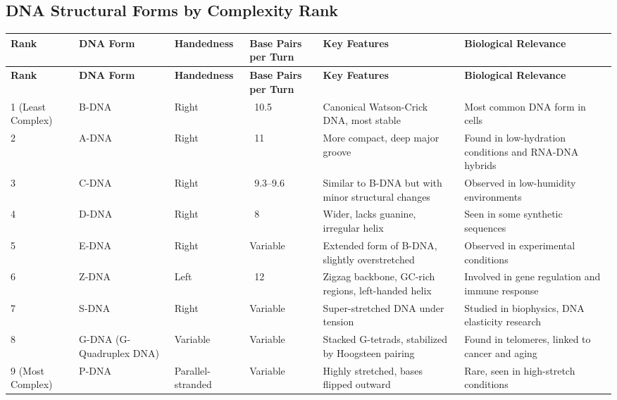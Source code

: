 \documentclass{article}
\begin{document}
\begin{landscape}

\section*{DNA Structural Forms by Complexity Rank}

\renewcommand{\arraystretch}{1.3}

\begin{longtable}{|p{2.2cm}|p{2.5cm}|p{2.2cm}|p{2.2cm}|p{4.5cm}|p{5.5cm}|}
\hline
\textbf{Rank} & 
\textbf{DNA Form} & 
\textbf{Handedness} & 
\textbf{Base Pairs per Turn} & 
\textbf{Key Features} & 
\textbf{Biological Relevance} \\
\hline
\endfirsthead

\hline
\textbf{Rank} & 
\textbf{DNA Form} & 
\textbf{Handedness} & 
\textbf{Base Pairs per Turn} & 
\textbf{Key Features} & 
\textbf{Biological Relevance} \\
\hline
\endhead

1 (Least Complex) & B-DNA & Right & ~10.5 & Canonical Watson-Crick DNA, most stable & Most common DNA form in cells \\
\hline
2 & A-DNA & Right & ~11 & More compact, deep major groove & Found in low-hydration conditions and RNA-DNA hybrids \\
\hline
3 & C-DNA & Right & ~9.3–9.6 & Similar to B-DNA but with minor structural changes & Observed in low-humidity environments \\
\hline
4 & D-DNA & Right & ~8 & Wider, lacks guanine, irregular helix & Seen in some synthetic sequences \\
\hline
5 & E-DNA & Right & Variable & Extended form of B-DNA, slightly overstretched & Observed in experimental conditions \\
\hline
6 & Z-DNA & Left & ~12 & Zigzag backbone, GC-rich regions, left-handed helix & Involved in gene regulation and immune response \\
\hline
7 & S-DNA & Right & Variable & Super-stretched DNA under tension & Studied in biophysics, DNA elasticity research \\
\hline
8 & G-DNA (G-Quadruplex DNA) & Variable & Variable & Stacked G-tetrads, stabilized by Hoogsteen pairing & Found in telomeres, linked to cancer and aging \\
\hline
9 (Most Complex) & P-DNA & Parallel-stranded & Variable & Highly stretched, bases flipped outward & Rare, seen in high-stretch conditions \\
\hline

\end{longtable}

\end{landscape}
\end{document}
